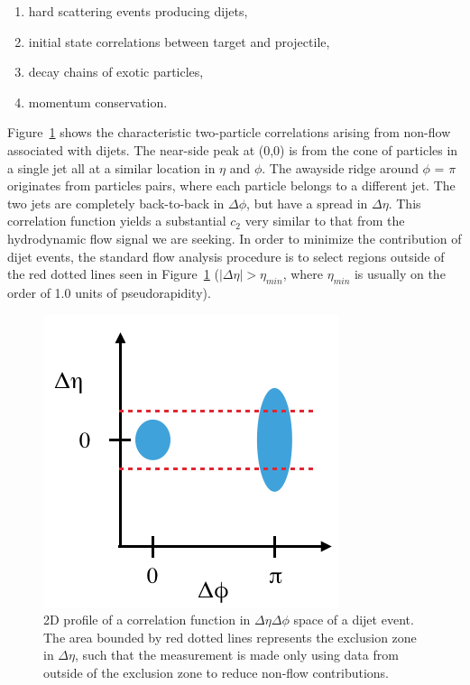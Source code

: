 \begin{enumerate}
\item hard scattering events producing dijets,
\item initial state correlations between target and projectile,
\item decay chains of exotic particles,
\item momentum conservation.
\end{enumerate}

Figure~\ref{fig:jet_corr_example} shows the characteristic two-particle correlations arising from non-flow associated with dijets. The near-side peak at (0,0) is from the cone of particles in a single jet all at a similar location in $\eta$ and $\phi$. The awayside ridge around $\phi$ = $\pi$ originates from particles pairs, where each particle belongs to a different jet. The two jets are completely back-to-back in $\Delta\phi$, but have a spread in $\Delta\eta$. This correlation function yields a substantial $c_2$ very similar to that from the hydrodynamic flow signal we are seeking. In order to minimize the contribution of dijet events, the standard flow analysis procedure is to select regions outside of the red dotted lines seen in Figure~\ref{fig:jet_corr_example} ($|\Delta\eta| > \eta_{min}$, where $\eta_{min}$ is usually on the order of 1.0 units of pseudorapidity).

\begin{figure}[!h]
\begin{center}
\includegraphics[width=0.5\linewidth]{figs/jet_corr_example.png}
\caption{2D profile of a correlation function in $\Delta\eta \Delta\phi$ space of a dijet event. The area bounded by red dotted lines represents the exclusion zone in $\Delta\eta$, such that the measurement is made only using data from outside of the exclusion zone to reduce non-flow contributions.}
\label{fig:jet_corr_example}
\end{center}
\end{figure}

